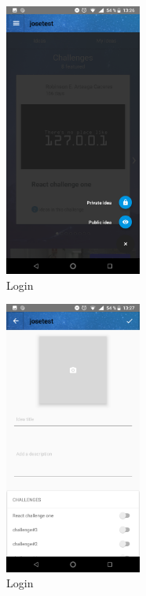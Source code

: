 \begin{figure}[!h]
	\begin{center}
		\includegraphics[width=0.4\textwidth]{./img/anexo1/inicio_crear_idea.png}
		\caption{Login}
		\label{fig:inicio_crear_idea}
	\end{center}
\end{figure}

\begin{figure}[!h]
	\begin{center}
		\includegraphics[width=0.4\textwidth]{./img/anexo1/crear_idea.png}
		\caption{Login}
		\label{fig:crear_idea}
	\end{center}
\end{figure}

